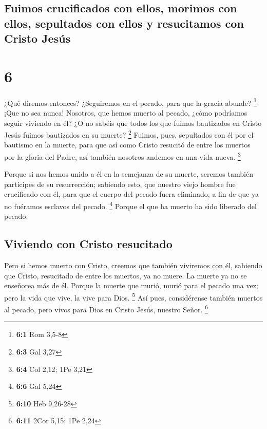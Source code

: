 \hypertarget{fuimos-crucificados-con-ellos-morimos-con-ellos-sepultados-con-ellos-y-resucitamos-con-cristo-jesuxfas}{%
\subsection{Fuimos crucificados con ellos, morimos con ellos, sepultados
con ellos y resucitamos con Cristo
Jesús}\label{fuimos-crucificados-con-ellos-morimos-con-ellos-sepultados-con-ellos-y-resucitamos-con-cristo-jesuxfas}}

\hypertarget{section-5}{%
\section{6}\label{section-5}}

 ¿Qué diremos entonces? ¿Seguiremos en el pecado, para que
la gracia abunde? \footnote{\textbf{6:1} Rom 3,5-8}  ¡Que
no sea nunca! Nosotros, que hemos muerto al pecado, ¿cómo podríamos
seguir viviendo en él?  ¿O no sabéis que todos los que
fuimos bautizados en Cristo Jesús fuimos bautizados en su muerte?
\footnote{\textbf{6:3} Gal 3,27}  Fuimos, pues, sepultados
con él por el bautismo en la muerte, para que así como Cristo resucitó
de entre los muertos por la gloria del Padre, así también nosotros
andemos en una vida nueva. \footnote{\textbf{6:4} Col 2,12; 1Pe 3,21}

 Porque si nos hemos unido a él en la semejanza de su
muerte, seremos también partícipes de su resurrección; 
sabiendo esto, que nuestro viejo hombre fue crucificado con él, para que
el cuerpo del pecado fuera eliminado, a fin de que ya no fuéramos
esclavos del pecado. \footnote{\textbf{6:6} Gal 5,24} 
Porque el que ha muerto ha sido liberado del pecado.

\hypertarget{viviendo-con-cristo-resucitado}{%
\subsection{Viviendo con Cristo
resucitado}\label{viviendo-con-cristo-resucitado}}

 Pero si hemos muerto con Cristo, creemos que también
viviremos con él,  sabiendo que Cristo, resucitado de
entre los muertos, ya no muere. La muerte ya no se enseñorea más de él.
 Porque la muerte que murió, murió para el pecado una
vez; pero la vida que vive, la vive para Dios. \footnote{\textbf{6:10}
  Heb 9,26-28}  Así pues, considérense también muertos al
pecado, pero vivos para Dios en Cristo Jesús, nuestro Señor. \footnote{\textbf{6:11}
  2Cor 5,15; 1Pe 2,24}

